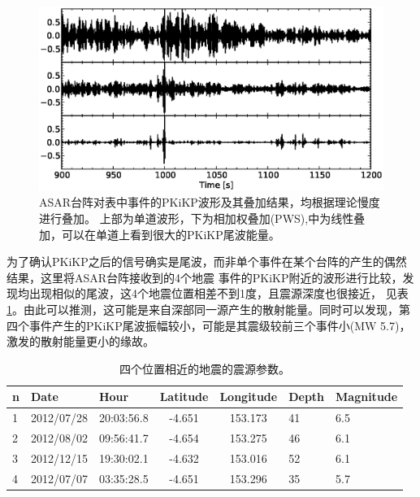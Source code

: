 \begin{figure}
	\centering
	\includegraphics[width=12cm,height=6cm]{fig/chap3/asar_mul.eps}
	\caption{ASAR台阵对表中事件的PKiKP波形及其叠加结果，均根据理论慢度进行叠加。%
上部为单道波形，下为相加权叠加(PWS),中为线性叠加，可以在单道上看到很大的PKiKP尾波能量。}
	\label{asar_mul}
\end{figure}

为了确认PKiKP之后的信号确实是尾波，而非单个事件在某个台阵的产生的偶然结果，这里将ASAR台阵接收到的4个地震
事件的PKiKP附近的波形进行比较，发现均出现相似的尾波，这4个地震位置相差不到1度，且震源深度也很接近，
见表\ref{evtlst1}。由此可以推测，这可能是来自深部同一源产生的散射能量。同时可以发现，第四个事件产生的PKiKP尾波振幅较小，可能是其震级较前三个事件小(MW 5.7)，激发的散射能量更小的缘故。

\begin{table}[!ht]
\centering
\begin{tabular}{*{3}{l}*{2}{c}*{2}{l}}
\hline
n & Date & Hour & Latitude & Longitude & Depth & Magnitude\\
\hline
1 & 2012/07/28 & 20:03:56.8 &  -4.651  &  153.173  &  41  & 6.5\\
2 & 2012/08/02 & 09:56:41.7 &  -4.654  &  153.275  &  46  & 6.1\\
3 & 2012/12/15 & 19:30:02.1 &  -4.632  &  153.016  &  52  & 6.1\\
4 & 2012/07/07 & 03:35:28.5 &  -4.651  &  153.296  &  35  & 5.7\\
\hline
\end{tabular}
\caption{四个位置相近的地震的震源参数。}
\label{evtlst1}
\end{table}

